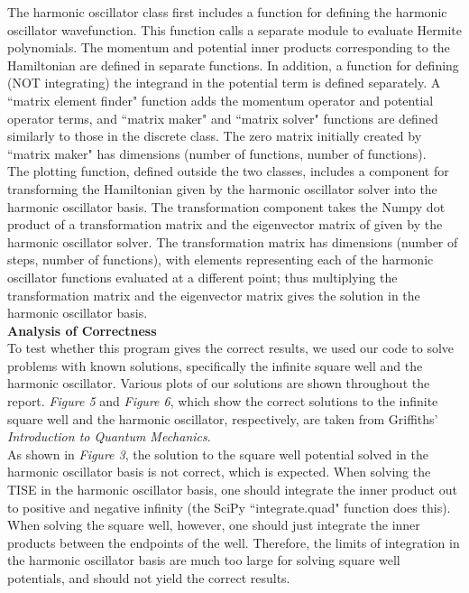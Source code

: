 \documentclass[%
 reprint,
 amsmath,amssymb,
 aps,
]{revtex4-1}
\begin{document}
\noindent The harmonic oscillator class first includes a function for defining the harmonic oscillator wavefunction.  This function calls a separate module to evaluate Hermite polynomials.  The momentum and potential inner products corresponding to the Hamiltonian are defined in separate functions.  In addition, a function for defining (NOT integrating) the integrand in the potential term is defined separately.  A ``matrix element finder" function adds the momentum operator and potential operator terms, and ``matrix maker" and ``matrix solver" functions are defined similarly to those in the discrete class.  The zero matrix initially created by ``matrix maker" has dimensions (number of functions, number of functions).\\

\noindent The plotting function, defined outside the two classes, includes a component for transforming the Hamiltonian given by the harmonic oscillator solver into the harmonic oscillator basis.  The transformation component takes the Numpy dot product of a transformation matrix and the eigenvector matrix of given by the harmonic oscillator solver.  The transformation matrix has dimensions (number of steps, number of functions), with elements representing each of the harmonic oscillator functions evaluated at a different point; thus multiplying the transformation matrix and the eigenvector matrix gives the solution in the harmonic oscillator basis.\\

\noindent \textbf{Analysis of Correctness}\\

\noindent To test whether this program gives the correct results, we used our code to solve problems with known solutions, specifically the infinite square well and the harmonic oscillator.  Various plots of our solutions are shown throughout the report.  \textit{Figure 5} and \textit{Figure 6}, which show the correct solutions to the infinite square well and the harmonic oscillator, respectively, are taken from Griffiths' \textit{Introduction to Quantum Mechanics}.\\

\noindent As shown in \textit{Figure 3}, the solution to the square well potential solved in the harmonic oscillator basis is not correct, which is expected.  When solving the TISE in the harmonic oscillator basis, one should integrate the inner product out to positive and negative infinity (the SciPy ``integrate.quad" function does this).  When solving the square well, however, one should just integrate the inner products between the endpoints of the well.  Therefore, the limits of integration in the harmonic oscillator basis are much too large for solving square well potentials, and should not yield the correct results.\\
\end{document}

